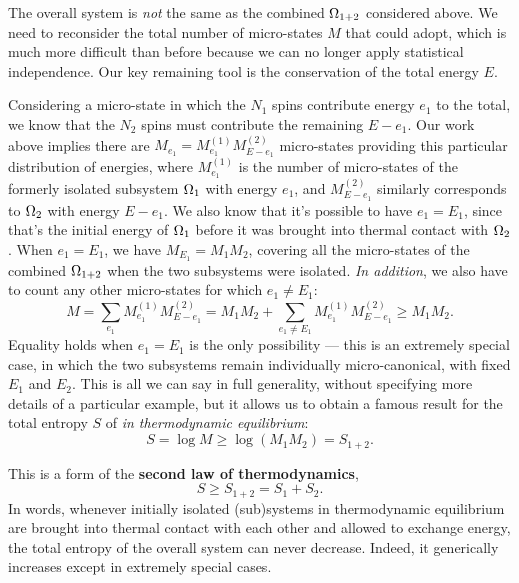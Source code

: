The overall system \Om is \textit{not} the same as the combined $\Omega_{1+2}$ considered above.
We need to reconsider the total number of micro-states $M$ that \Om could adopt, which is much more difficult than before because we can no longer apply statistical independence.
Our key remaining tool is the conservation of the total energy $E$.

Considering a micro-state in which the $N_1$ spins contribute energy $e_1$ to the total, we know that the $N_2$ spins must contribute the remaining $E - e_1$.
Our work above implies there are $M_{e_1} = M_{e_1}^{(1)} M_{E - e_1}^{(2)}$ micro-states providing this particular distribution of energies, where $M_{e_1}^{(1)}$ is the number of micro-states of the formerly isolated subsystem $\Omega_1$ with energy $e_1$, and $M_{E - e_1}^{(2)}$ similarly corresponds to $\Omega_2$ with energy $E - e_1$.
We also know that it's possible to have $e_1 = E_1$, since that's the initial energy of $\Omega_1$ before it was brought into thermal contact with $\Omega_2$.
When $e_1 = E_1$, we have $M_{E_1} = M_1 M_2$, covering all the micro-states of the combined $\Omega_{1+2}$ when the two subsystems were isolated.
\textit{In addition}, we also have to count any other micro-states for which $e_1 \ne E_1$:
\begin{equation}
  \label{eq:micro_sum}
  M = \sum_{e_1} M_{e_1}^{(1)} M_{E - e_1}^{(2)} = M_1 M_2 + \sum_{e_1 \ne E_1} M_{e_1}^{(1)} M_{E - e_1}^{(2)} \geq M_1 M_2.
\end{equation}
Equality holds when $e_1 = E_1$ is the only possibility --- this is an extremely special case, in which the two subsystems remain individually micro-canonical, with fixed $E_1$ and $E_2$.
This is all we can say in full generality, without specifying more details of a particular example, but it allows us to obtain a famous result for the total entropy $S$ of \Om \textit{in thermodynamic equilibrium}:
\begin{equation*}
  S = \log M \geq \log\left(M_1 M_2\right) = S_{1+2}.
\end{equation*}

\begin{shaded}
  This is a form of the \textbf{second law of thermodynamics},
  \begin{equation*}
    S \geq S_{1 + 2} = S_1 + S_2.
  \end{equation*}
  In words, whenever initially isolated (sub)systems in thermodynamic equilibrium are brought into thermal contact with each other and allowed to exchange energy, the total entropy of the overall system can never decrease.
  Indeed, it generically increases except in extremely special cases.
\end{shaded}

